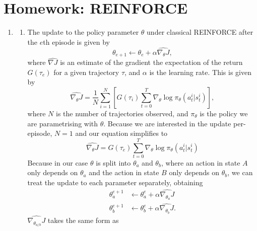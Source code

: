 \documentclass{article}
\begin{document}
\section*{Homework: REINFORCE}
\begin{enumerate}
	\item \begin{enumerate}
		      \item \label{8.4.1a} The update to the policy parameter  $\theta$ under classical
		            REINFORCE after the $e$th episode is given by
		            \begin{equation}\label{eq:policy_update}
			            \theta_{e+1} \leftarrow \theta_e + \alpha \widehat{\nabla_\theta J},
		            \end{equation}
		            where $\widehat{\nabla J}$ is an estimate of the gradient the expectation of the
		            return $G(\tau_e)$ for a given trajectory $\tau$, and $\alpha$ is the learning rate.
		            This is given by
		            \begin{equation}
			            \widehat{\nabla_\theta J} = \frac{1}{N} \sum^N_{i=1}\left[G(\tau_i)
				            \sum_{t=0}^T\nabla_\theta \log \pi_\theta (a_t^i | s_t^i)\right],
		            \end{equation}
		            where $N$ is the number of trajectories observed, and $\pi_\theta$ is the policy we
		            are parametrising with $\theta$. Because we are interested in the update
		            per-episode, $N=1$ and our equation simplifies to
		            \begin{equation}\label{eq:reinforce_episode_grad}
			            \widehat{\nabla_\theta J} = G(\tau_e) \sum_{t=0}^T\nabla_\theta \log \pi_\theta (a_t^i
			            | s_t^i)
		            \end{equation}
		            Because in our case $\theta$ is split into $\theta_a$ and $\theta_b$, where an
		            action in state $A$ only depends on $\theta_a$ and the action in state $B$ only
		            depends on $\theta_b$, we can treat the update to each parameter separately,
		            obtaining
		            \begin{align}
			            \theta^{e+1}_a & \leftarrow \theta^e_a + \alpha \widehat{\nabla_{\theta_a} J}  \\
			            \theta^{e+1}_b & \leftarrow \theta^e_b + \alpha \widehat{\nabla_{\theta_b} J}.
		            \end{align}
		            $\widehat{\nabla_{\theta_{a/b}}J}$ takes the same form as

\end{enumerate}
\end{enumerate}
\end{document}
